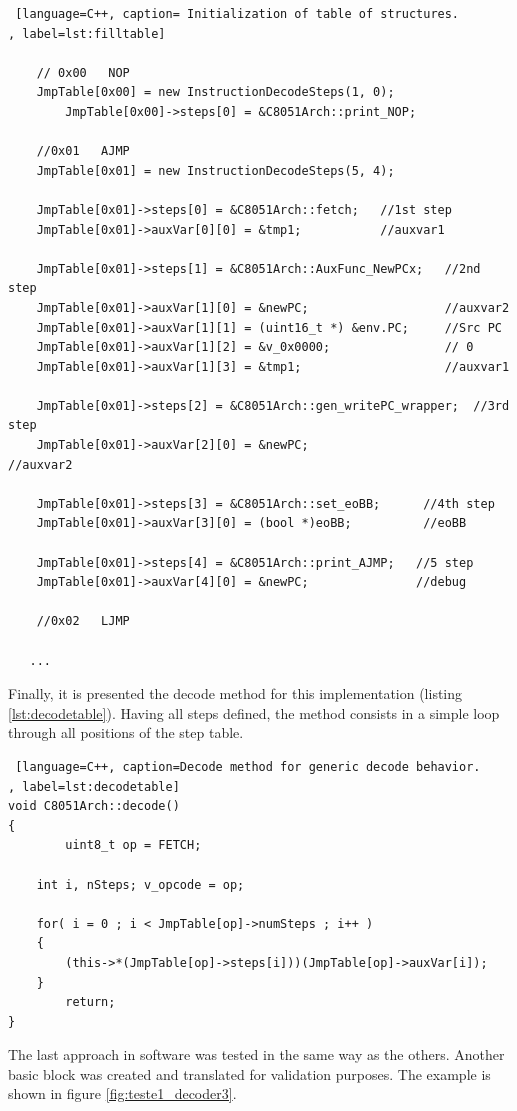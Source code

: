 \begin{lstlisting} [language=C++, caption= Initialization of table of structures.
, label=lst:filltable]
	
	// 0x00   NOP
	JmpTable[0x00] = new InstructionDecodeSteps(1, 0);
        JmpTable[0x00]->steps[0] = &C8051Arch::print_NOP;

	//0x01   AJMP
	JmpTable[0x01] = new InstructionDecodeSteps(5, 4);

	JmpTable[0x01]->steps[0] = &C8051Arch::fetch;   //1st step
	JmpTable[0x01]->auxVar[0][0] = &tmp1;           //auxvar1

	JmpTable[0x01]->steps[1] = &C8051Arch::AuxFunc_NewPCx;   //2nd step
	JmpTable[0x01]->auxVar[1][0] = &newPC;                   //auxvar2
	JmpTable[0x01]->auxVar[1][1] = (uint16_t *) &env.PC;     //Src PC
	JmpTable[0x01]->auxVar[1][2] = &v_0x0000;                // 0 
	JmpTable[0x01]->auxVar[1][3] = &tmp1;                    //auxvar1

	JmpTable[0x01]->steps[2] = &C8051Arch::gen_writePC_wrapper;  //3rd step
	JmpTable[0x01]->auxVar[2][0] = &newPC;                    //auxvar2

	JmpTable[0x01]->steps[3] = &C8051Arch::set_eoBB;      //4th step
	JmpTable[0x01]->auxVar[3][0] = (bool *)eoBB;          //eoBB
        
	JmpTable[0x01]->steps[4] = &C8051Arch::print_AJMP;   //5 step
	JmpTable[0x01]->auxVar[4][0] = &newPC;               //debug

	//0x02   LJMP
	
   ...
\end{lstlisting}

Finally, it is presented the decode method for this implementation (listing \ref{lst:decodetable}). Having all steps defined, the method consists in a simple loop through all positions of the step table. 

\begin{lstlisting} [language=C++, caption=Decode method for generic decode behavior.
, label=lst:decodetable]
void C8051Arch::decode()
{
		uint8_t op = FETCH;

    int i, nSteps; v_opcode = op;

    for( i = 0 ; i < JmpTable[op]->numSteps ; i++ )
    {
    	(this->*(JmpTable[op]->steps[i]))(JmpTable[op]->auxVar[i]);
    }      
		return;
}
\end{lstlisting}

\newpage
{}
The last approach in software was tested in the same way as the others. Another basic block was created and translated for validation purposes. The example is shown in figure \ref{fig:teste1_decoder3}.


